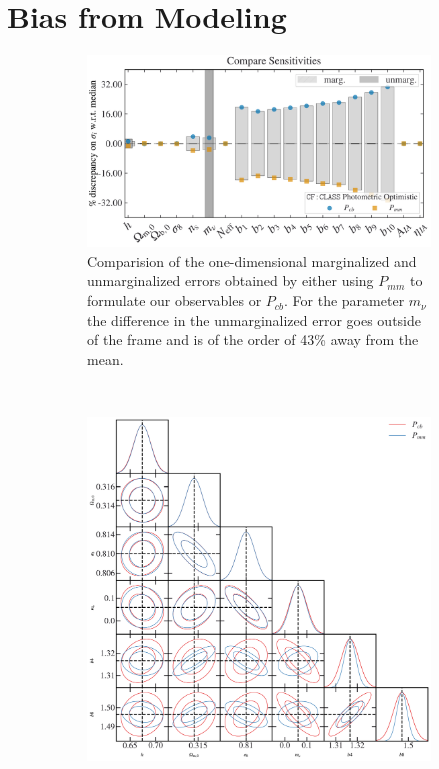 \documentclass[oneside]{book}
\newcommand*{\cosmicfish}{\texttt{CF}\xspace}
\newcommand*{\class}{{\tt CLASS}\xspace}
\begin{document}
\section{Bias from Modeling}
\begin{figure}
    \centering
    \caption{We show the effect of switching the formulation of our observables to use $P_{mm}$ instead of $P_{cb}$. We compare the results of the fisher forecast for the photometric optimistic using \cosmicfish:\class as our code.}
    \begin{subfigure}[b]{0.70\textwidth}
        \centering
        \includegraphics[width=\textwidth]{cosmopars_PmmvPcb_photo_Comparision_error_comparison.pdf}
        \caption{Comparision of the one-dimensional marginalized and unmarginalized errors obtained by either using $P_{mm}$ to formulate our observables or $P_{cb}$. For the parameter $m_\nu$ the difference in the unmarginalized error goes outside of the frame and is of the order of 43\% away from the mean.}
        \label{fig:dotsPcbVPmm}
    \end{subfigure}
    \\
    \begin{subfigure}[b]{0.70\textwidth}
        \centering
        \includegraphics[width=\textwidth]{nonuicance_PmmvPcb_photo_Comparision_contours.pdf}

\end{subfigure}
\end{figure}
\end{document}
